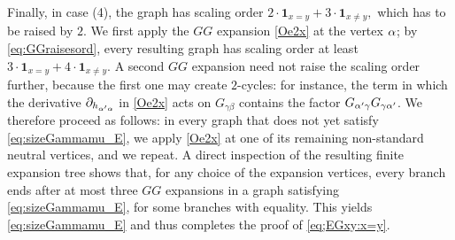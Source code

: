 Finally, in case (4), the graph  has scaling order $2\cdot \mathbf 1_{x= y}+3\cdot \mathbf 1_{x\ne y},$ which has to be raised by $2$. We first apply the $GG$ expansion \eqref{Oe2x} at the vertex $\alpha$; by \eqref{eq:GGraisesord}, every resulting graph has scaling order at least $3\cdot \mathbf 1_{x= y}+4\cdot \mathbf 1_{x\ne y}$. A second $GG$ expansion need not raise the scaling order further, because the first one may create $2$-cycles: for instance, the term in which the derivative $\partial_{h_{\alpha'\alpha}}$ in \eqref{Oe2x} acts on $G_{\gamma\beta}$ contains the factor $G_{\alpha'\gamma}G_{\gamma\alpha'}$. We therefore proceed as follows: in every graph that does not yet satisfy \eqref{eq:sizeGammamu_E}, we apply \eqref{Oe2x} at one of its remaining non-standard neutral vertices, and we repeat. A direct inspection of the resulting finite expansion tree shows that, for any choice of the expansion vertices, every branch ends after at most three $GG$ expansions in a graph satisfying \eqref{eq:sizeGammamu_E}, for some branches with equality.
This yields \eqref{eq:sizeGammamu_E} and thus completes the proof of \eqref{eq;EGxy:x=y}.



